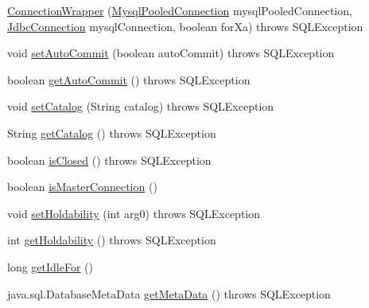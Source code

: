 \begin{DoxyCompactItemize}
\item 
\mbox{\hyperlink{classcom_1_1mysql_1_1cj_1_1jdbc_1_1_connection_wrapper_a6dbecfe42d98fb8c3f0ff7081ccc07cf}{Connection\+Wrapper}} (\mbox{\hyperlink{classcom_1_1mysql_1_1cj_1_1jdbc_1_1_mysql_pooled_connection}{Mysql\+Pooled\+Connection}} mysql\+Pooled\+Connection, \mbox{\hyperlink{interfacecom_1_1mysql_1_1cj_1_1jdbc_1_1_jdbc_connection}{Jdbc\+Connection}} mysql\+Connection, boolean for\+Xa)  throws S\+Q\+L\+Exception 
\item 
void \mbox{\hyperlink{classcom_1_1mysql_1_1cj_1_1jdbc_1_1_connection_wrapper_aabb56a4ee8754e61709454d48379bbe4}{set\+Auto\+Commit}} (boolean auto\+Commit)  throws S\+Q\+L\+Exception 
\item 
boolean \mbox{\hyperlink{classcom_1_1mysql_1_1cj_1_1jdbc_1_1_connection_wrapper_ac839f2b5d2e5f2c5a6b9e29c922578c0}{get\+Auto\+Commit}} ()  throws S\+Q\+L\+Exception 
\item 
void \mbox{\hyperlink{classcom_1_1mysql_1_1cj_1_1jdbc_1_1_connection_wrapper_a86b87e7280723520f0a14160f927d5ef}{set\+Catalog}} (String catalog)  throws S\+Q\+L\+Exception 
\item 
String \mbox{\hyperlink{classcom_1_1mysql_1_1cj_1_1jdbc_1_1_connection_wrapper_af0dd144455d23990970f785e0236684b}{get\+Catalog}} ()  throws S\+Q\+L\+Exception 
\item 
boolean \mbox{\hyperlink{classcom_1_1mysql_1_1cj_1_1jdbc_1_1_connection_wrapper_a9197d0be68cabb03aec34d3f1fdf3c72}{is\+Closed}} ()  throws S\+Q\+L\+Exception 
\item 
boolean \mbox{\hyperlink{classcom_1_1mysql_1_1cj_1_1jdbc_1_1_connection_wrapper_a7e344c8e7ee5db8d3e1a0aa96bd6e1fd}{is\+Master\+Connection}} ()
\item 
void \mbox{\hyperlink{classcom_1_1mysql_1_1cj_1_1jdbc_1_1_connection_wrapper_ad509e7bbbdf0dd5e76bdc7830ef1dc9d}{set\+Holdability}} (int arg0)  throws S\+Q\+L\+Exception 
\item 
int \mbox{\hyperlink{classcom_1_1mysql_1_1cj_1_1jdbc_1_1_connection_wrapper_a830f2f6ec4a9c340bb0e1f45ea1190e4}{get\+Holdability}} ()  throws S\+Q\+L\+Exception 
\item 
long \mbox{\hyperlink{classcom_1_1mysql_1_1cj_1_1jdbc_1_1_connection_wrapper_a4894df9d353212ae8b4e0860c15e6a6e}{get\+Idle\+For}} ()
\item 
java.\+sql.\+Database\+Meta\+Data \mbox{\hyperlink{classcom_1_1mysql_1_1cj_1_1jdbc_1_1_connection_wrapper_ac3a18047b84616a9c5d751967464c880}{get\+Meta\+Data}} ()  throws S\+Q\+L\+Exception 

\end{DoxyCompactItemize}
